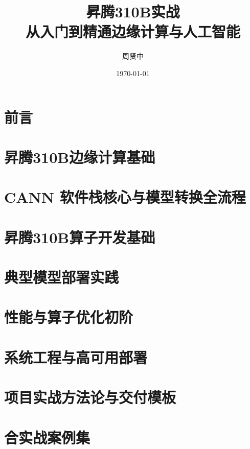 \documentclass[fontsize=12pt, paper=a4, oneside, DIV=calc]{scrbook}
\title{昇腾310B实战\\从入门到精通边缘计算与人工智能}
\author{周贤中}
\date{\today}
\theoremstyle{break}
\begin{document}
\maketitle

\frontmatter
\chapter*{前言}



\tableofcontents

\mainmatter


\chapter{昇腾310B边缘计算基础}


\chapter{CANN 软件栈核心与模型转换全流程}


\chapter{昇腾310B算子开发基础}


\chapter{典型模型部署实践}


\chapter{性能与算子优化初阶}


\chapter{系统工程与高可用部署}


\chapter{项目实战方法论与交付模板}


\chapter{合实战案例集}

\end{document}
